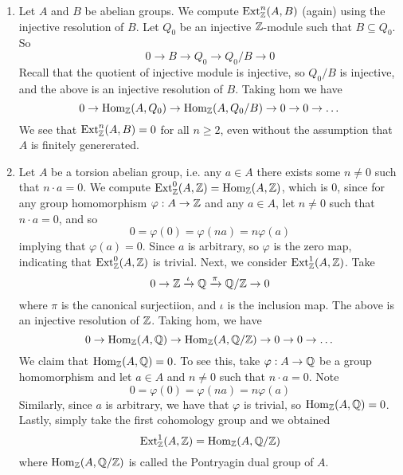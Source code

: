\medskip

\begin{ex}
    \hfill

    \begin{enumerate}
        \item Let $A$ and $B$ be abelian groups. We compute $\operatorname{Ext}_{\mathbb Z}^n(A,B)$ (again) using the injective resolution of $B$. Let $Q_0$ be an injective ${\mathbb Z}$-module such that $B\subseteq Q_0$. So
        \[0 \to B\to Q_0 \to Q_0/B \to 0\]
        Recall that the quotient of injective module is injective, so $Q_0/B$ is injective, and the above is an injective resolution of $B$. Taking hom we have 
        \[0 \to \operatorname{Hom}_{\mathbb Z}(A,Q_0) \to \operatorname{Hom}_{\mathbb Z}(A, Q_0/B) \to 0 \to 0 \to \dots\]
        We see that $\operatorname{Ext}_{\mathbb Z}^n(A,B)=0$ for all $n\geq 2$, even without the assumption that $A$ is finitely genererated.
        \item Let $A$ be a torsion abelian group, i.e. any $a\in A$ there exists some $n\neq 0$ such that $n\cdot a = 0$. We compute $\operatorname{Ext}_{\mathbb Z}^0(A,{\mathbb Z}) = \operatorname{Hom}_{\mathbb Z}(A,{\mathbb Z})$, which is $0$, since for any group homomorphism $\varphi:A\to {\mathbb Z}$ and any $a\in A$, let $n\neq 0$ such that $n\cdot a = 0$, and so 
        \[0 = \varphi(0) = \varphi(na) = n\varphi(a)\]
        implying that $\varphi(a)=0$. Since $a$ is arbitrary, so $\varphi$ is the zero map, indicating that $\operatorname{Ext}_{\mathbb Z}^0(A,{\mathbb Z})$ is trivial. Next, we consider $\operatorname{Ext}_{\mathbb Z}^1(A,{\mathbb Z})$. Take 
        \[0 \to {\mathbb Z} \xrightarrow{\iota} {\mathbb Q} \xrightarrow{\pi} {\mathbb Q}/{\mathbb Z} \to 0\]
        where $\pi$ is the canonical surjectiion, and $\iota$ is the inclusion map. The above is an injective resolution of ${\mathbb Z}$. Taking hom, we have 
        \[0 \to \operatorname{Hom}_{\mathbb Z}(A,{\mathbb Q})\to \operatorname{Hom}_{\mathbb Z}(A, {\mathbb Q}/{\mathbb Z}) \to 0 \to 0 \to \dots\]
        We claim that $\operatorname{Hom}_{\mathbb Z}(A,{\mathbb Q})=0$. To see this, take $\varphi:A\to {\mathbb Q}$ be a group homomorphism and let $a\in A$ and $n\neq 0$ such that $n\cdot a = 0$. Note
        \[0 = \varphi(0) = \varphi(na) = n\varphi(a)\]
        Similarly, since $a$ is arbitrary, we have that $\varphi$ is trivial, so $\operatorname{Hom}_{\mathbb Z}(A,{\mathbb Q})=0$. Lastly, simply take the first cohomology group and we obtained
        \[\operatorname{Ext}_{\mathbb Z}^1 (A,{\mathbb Z}) = \operatorname{Hom}_{\mathbb Z}(A,{\mathbb Q}/{\mathbb Z})\]
        where $\operatorname{Hom}_{\mathbb Z}(A,{\mathbb Q}/{\mathbb Z})$ is called the Pontryagin dual group of $A$.
    \end{enumerate}
\end{ex}

\medskip

